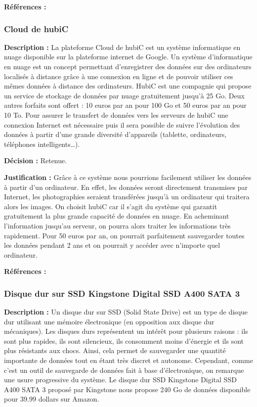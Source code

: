 \textbf{Références :} \cite{casd} \cite{amsd}

\subsubsection{Cloud de hubiC}
\textbf{Description :} La plateforme Cloud de hubiC est un système informatique en nuage disponible sur la plateforme internet de Google. Un système d’informatique en nuage est un concept permettant d’enregistrer des données sur des ordinateurs localisés à distance grâce à une connexion en ligne et de pouvoir utiliser ces mêmes données à distance des ordinateurs. HubiC est une compagnie qui propose un service de stockage de données par nuage gratuitement jusqu’à 25 Go. Deux autres forfaits sont offert : 10 euros par an pour 100 Go et 50 euros par an pour 10 To. Pour assurer le transfert de données vers les serveurs de hubiC une connexion Internet est nécessaire puis il sera possible de suivre l’évolution des données à partir d’une grande diversité d’appareils (tablette, ordinateurs, téléphones intelligents…). 

\textbf{Décision :} Retenue.

\textbf{Justification :} Grâce à ce système nous pourrions facilement utiliser les données à partir d’un ordinateur. En effet, les données seront directement transmises par Internet, les photographies seraient transférées jusqu’à un ordinateur qui traitera alors les images. On choisit hubiC car il s’agit du système qui garantit gratuitement la plus grande capacité de données en nuage.  En acheminant l’information jusqu’au serveur, on pourra alors traiter les informations très rapidement. Pour 50 euros par an, on pourrait parfaitement sauvegarder toutes les données pendant 2 ans et on pourrait y accéder avec n’importe quel ordinateur.

\textbf{Références :} \cite{hubic} \cite{clgo} \cite{incl}

\subsubsection{Disque dur sur SSD Kingstone Digital SSD A400 SATA 3 }
\textbf{Description :} Un disque dur sur SSD (Solid State Drive) est un type de disque dur utilisant une mémoire électronique (en opposition aux disque dur mécaniques). Les disques durs représentent un intérêt pour plusieurs raisons : ils sont plus rapides, ils sont silencieux, ils consomment moins d’énergie et ils sont plus résistants aux chocs. Ainsi, cela permet de sauvegarder une quantité importante de données tout en étant très discret et autonome. Cependant, comme c’est un outil de sauvegarde de données fait à base d’électronique, on remarque une usure progressive du système. Le disque dur SSD Kingstone Digital SSD A400 SATA 3 proposé par Kingstone nous propose 240 Go de données disponible pour 39.99 dollars sur Amazon. 


